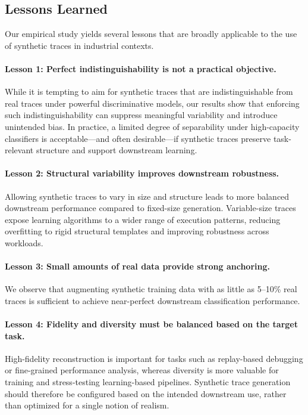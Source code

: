 \documentclass[sigconf,review]{acmart}
\begin{document}
\subsection{Lessons Learned}

Our empirical study yields several lessons that are broadly applicable to the use of synthetic traces in industrial contexts.

\paragraph{Lesson 1: Perfect indistinguishability is not a practical objective.}
While it is tempting to aim for synthetic traces that are indistinguishable from real traces under powerful discriminative models, our results show that enforcing such indistinguishability can suppress meaningful variability and introduce unintended bias. In practice, a limited degree of separability under high-capacity classifiers is acceptable---and often desirable---if synthetic traces preserve task-relevant structure and support downstream learning.

\paragraph{Lesson 2: Structural variability improves downstream robustness.}
Allowing synthetic traces to vary in size and structure leads to more balanced downstream performance compared to fixed-size generation. Variable-size traces expose learning algorithms to a wider range of execution patterns, reducing overfitting to rigid structural templates and improving robustness across workloads.

\paragraph{Lesson 3: Small amounts of real data provide strong anchoring.}
We observe that augmenting synthetic training data with as little as 5--10\% real traces is sufficient to achieve near-perfect downstream classification performance.


\paragraph{Lesson 4: Fidelity and diversity must be balanced based on the target task.}
High-fidelity reconstruction is important for tasks such as replay-based debugging or fine-grained performance analysis, whereas diversity is more valuable for training and stress-testing learning-based pipelines. Synthetic trace generation should therefore be configured based on the intended downstream use, rather than optimized for a single notion of realism.
\end{document}
